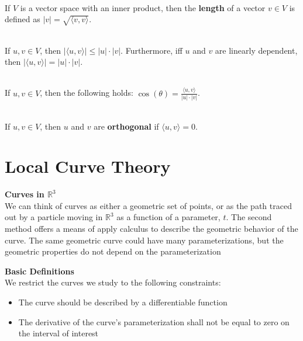 \documentclass{article}
\newcommand{\SecHead}[1]{\large \textbf{#1} \\}
\newcommand{\bb}[1]{\mathbb{#1}}
\begin{document}
\begin{definition} [Length] \ \\
  If $V$ is a vector space with an inner product, then the \textbf{length} of a vector $v \in V$
  is defined as $|v| = \sqrt{\langle v, v \rangle}$.
\end{definition}

\begin{lemma}  \ \\
  If $u, v \in V$, then $|\langle u, v \rangle| \le |u| \cdot |v|$.
  Furthermore, iff $u$ and $v$ are linearly dependent, then $|\langle u, v \rangle| = |u| \cdot |v|$.
\end{lemma}

\begin{definition}  \ \\
  If $u, v \in V$, then the following holds: $\cos(\theta) = \frac{\langle u, v \rangle}{|u| \cdot |v|}$.
\end{definition}

\begin{definition}  \ \\
  If $u, v \in V$, then $u$ and $v$ are \textbf{orthogonal} if $\langle u, v \rangle = 0$.
\end{definition}

\newpage

\section{Local Curve Theory}

\SecHead{Curves in $\bb{R}^3$}
We can think of curves as either a geometric set of points,
or as the path traced out by a particle moving in $\mathbb{R}^3$
as a function of a parameter, $t$.
The second method offers a means of apply calculus
to describe the geometric behavior of the curve.
The same geometric curve could have many parameterizations,
but the geometric properties do not depend on the parameterization

\SecHead{Basic Definitions}
We restrict the curves we study to the following constraints:
\begin{itemize}
  \item The curve should be described by a differentiable function
  \item {
        The derivative of the curve's parameterization
        shall not be equal to zero on the interval of interest
        }
\end{itemize}
\end{document}
